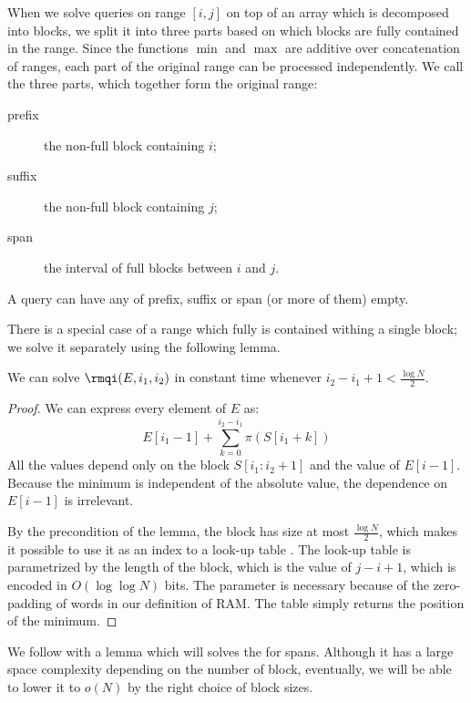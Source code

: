 When we solve queries on range $[i, j]$ on top of an array which is decomposed into blocks, we split it into three parts based on which blocks are fully contained in the range.
Since the functions $\min$ and $\max$ are additive over concatenation of ranges, each part of the original range can be processed independently.
We call the three parts, which together form the original range:
\begin{description}
	\item[prefix] the non-full block containing $i$;
	\item[suffix] the non-full block containing $j$;
	\item[span] the interval of full blocks between $i$ and $j$.
\end{description}
A query can have any of prefix, suffix or span (or more of them) empty.

There is a special case of a range which fully is contained withing a single block; we solve it separately using the following lemma.
\begin{lemma}\label{lemma:rmq1}
	We can solve $\rmqi(E, i_1, i_2)$ in constant time whenever $i_2 - i_1 + 1 < \frac{\log N}{2}$.
\end{lemma}
\begin{proof}
	We can express every element of $E$ as:
	$$E[i_1 - 1] + \sum_{k = 0}^{i_2 - i_1} \pi(S[i_1 + k])$$
	All the values depend only on the block $S[i_1 : i_2 + 1]$ and the value of $E[i - 1]$.
	Because the minimum is independent of the absolute value, the dependence on $E[i - 1]$ is irrelevant.
	
	By the precondition of the lemma, the block has size at most $\frac{\log N}{2}$, which makes it possible to use it as an index to a look-up table \rmqi.
	The look-up table is parametrized by the length of the block, which is the value of $j - i + 1$, which is encoded in $O(\log \log N)$ bits.
	The parameter is necessary because of the zero-padding of words in our definition of RAM.
	The table simply returns the position of the minimum.
\end{proof}

\bigbreak

We follow with a lemma which will solves the \rmqi{} for spans.
Although it has a large space complexity depending on the number of block, eventually, we will be able to lower it to $o(N)$ by the right choice of block sizes.

